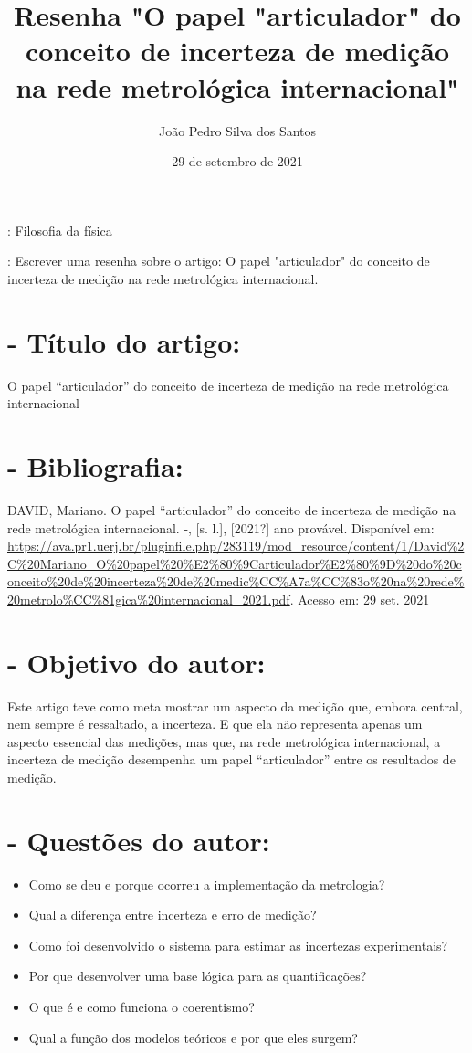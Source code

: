 \documentclass [a4paper, 12pt]{article}
\title{Resenha "O papel "articulador" do conceito de incerteza de medição na rede metrológica internacional"}
\author{João Pedro Silva dos Santos}
\date{29 de setembro de 2021}
\begin{document}
\maketitle

{}: Filosofia da física

{}: Escrever uma resenha sobre o artigo: O papel "articulador" do conceito de incerteza de medição na rede metrológica internacional. 

\section*{- Título do artigo:}

O papel “articulador” do conceito de incerteza de medição na rede metrológica internacional

\section*{-  Bibliografia:}

DAVID, Mariano. O papel “articulador” do conceito de incerteza de medição na rede metrológica internacional. -, [s. l.], [2021?] ano provável. Disponível em: \url{https://ava.pr1.uerj.br/pluginfile.php/283119/mod_resource/content/1/David%2C%20Mariano_O%20papel%20%E2%80%9Carticulador%E2%80%9D%20do%20conceito%20de%20incerteza%20de%20medic%CC%A7a%CC%83o%20na%20rede%20metrolo%CC%81gica%20internacional_2021.pdf}. Acesso em: 29 set. 2021

\section*{- Objetivo do autor:}

Este artigo teve como meta mostrar um aspecto da medição que, embora central, nem sempre é ressaltado, a incerteza. E que ela não representa apenas um aspecto essencial das medições, mas que, na rede metrológica internacional, a incerteza de medição desempenha um papel “articulador” entre os resultados de medição.

\section*{- Questões do autor:}

\begin{itemize}
    \item Como se deu e porque ocorreu a implementação da metrologia?
    \item Qual a diferença entre incerteza e erro de medição?
    \item Como foi desenvolvido o sistema para estimar as incertezas experimentais?
    \item Por que desenvolver uma base lógica para as quantificações?
    \item O que é e como funciona o coerentismo?
    \item Qual a função dos modelos teóricos e por que eles surgem? 
\end{itemize}
\end{document}
